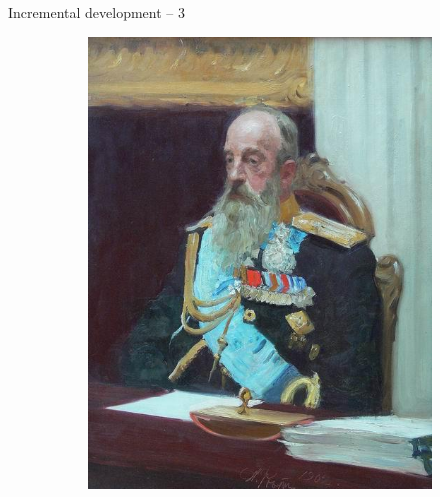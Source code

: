 \documentclass{beamer}
\begin{document}
\begin{frame}
{\centerline{Incremental development -- 3}}

\begin{figure}
\centering
\begin{subfigure}{.5\textwidth}
  \centering
  \includegraphics[width=.9\linewidth]{P2023.AIBCCSS.Drawing/sketch1.jpg}
\end{subfigure}%
\begin{subfigure}{.5\textwidth}
  \centering

\end{subfigure}
\end{figure}
\end{frame}
\end{document}
